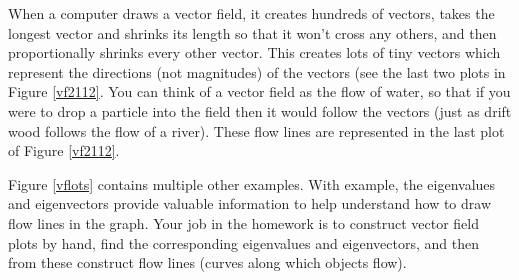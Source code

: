 \begin{example}
When a computer draws a vector field, it creates hundreds of vectors, takes the longest vector and shrinks its length so that it won't cross any others, and then proportionally shrinks every other vector. This creates lots of tiny vectors which represent the directions (not magnitudes) of the vectors (see the last two plots in Figure \ref{vf2112}. You can think of a vector field as the flow of water, so that if you were to drop a particle into the field then it would follow the vectors (just as drift wood follows the flow of a river). These flow lines are represented in the last plot of Figure \ref{vf2112}.
\end{example} 

Figure \ref{vflots} contains multiple other examples. With example, the eigenvalues and eigenvectors provide valuable information to help understand how to draw flow lines in the graph.  Your job in the homework is to construct vector field plots by hand, find the corresponding eigenvalues and eigenvectors, and then from these construct flow lines (curves along which objects flow).


